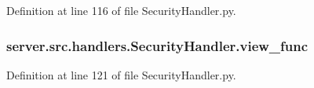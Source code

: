 Definition at line 116 of file Security\+Handler.\+py.

\subsubsection[{\texorpdfstring{view\+\_\+func}{view_func}}]{\setlength{\rightskip}{0pt plus 5cm}server.\+src.\+handlers.\+Security\+Handler.\+view\+\_\+func}\hypertarget{namespaceserver_1_1src_1_1handlers_1_1_security_handler_ab4b047d7ba77f3f3a53966cf8171751c}{}\label{namespaceserver_1_1src_1_1handlers_1_1_security_handler_ab4b047d7ba77f3f3a53966cf8171751c}


Definition at line 121 of file Security\+Handler.\+py.

